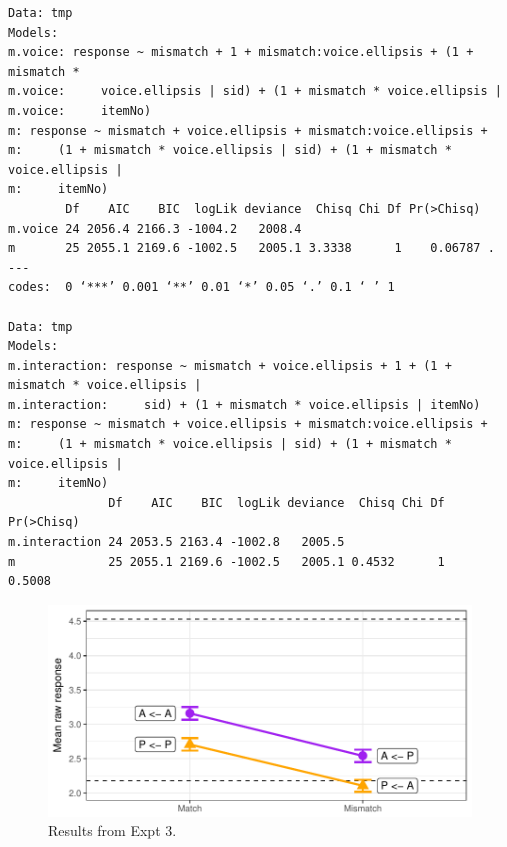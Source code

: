 \documentclass[11pt]{article}
\begin{document}
\begin{verbatim}
Data: tmp
Models:
m.voice: response ~ mismatch + 1 + mismatch:voice.ellipsis + (1 + mismatch * 
m.voice:     voice.ellipsis | sid) + (1 + mismatch * voice.ellipsis | 
m.voice:     itemNo)
m: response ~ mismatch + voice.ellipsis + mismatch:voice.ellipsis + 
m:     (1 + mismatch * voice.ellipsis | sid) + (1 + mismatch * voice.ellipsis | 
m:     itemNo)
        Df    AIC    BIC  logLik deviance  Chisq Chi Df Pr(>Chisq)  
m.voice 24 2056.4 2166.3 -1004.2   2008.4                           
m       25 2055.1 2169.6 -1002.5   2005.1 3.3338      1    0.06787 .
---
codes:  0 ‘***’ 0.001 ‘**’ 0.01 ‘*’ 0.05 ‘.’ 0.1 ‘ ’ 1

Data: tmp
Models:
m.interaction: response ~ mismatch + voice.ellipsis + 1 + (1 + mismatch * voice.ellipsis | 
m.interaction:     sid) + (1 + mismatch * voice.ellipsis | itemNo)
m: response ~ mismatch + voice.ellipsis + mismatch:voice.ellipsis + 
m:     (1 + mismatch * voice.ellipsis | sid) + (1 + mismatch * voice.ellipsis | 
m:     itemNo)
              Df    AIC    BIC  logLik deviance  Chisq Chi Df Pr(>Chisq)
m.interaction 24 2053.5 2163.4 -1002.8   2005.5                         
m             25 2055.1 2169.6 -1002.5   2005.1 0.4532      1     0.5008
\end{verbatim}


\begin{figure}[htbp]
\centering
\includegraphics[width=.9\linewidth]{img/expt-03-graph.pdf}
\caption{Results from Expt 3.}
\end{figure}
\end{document}
